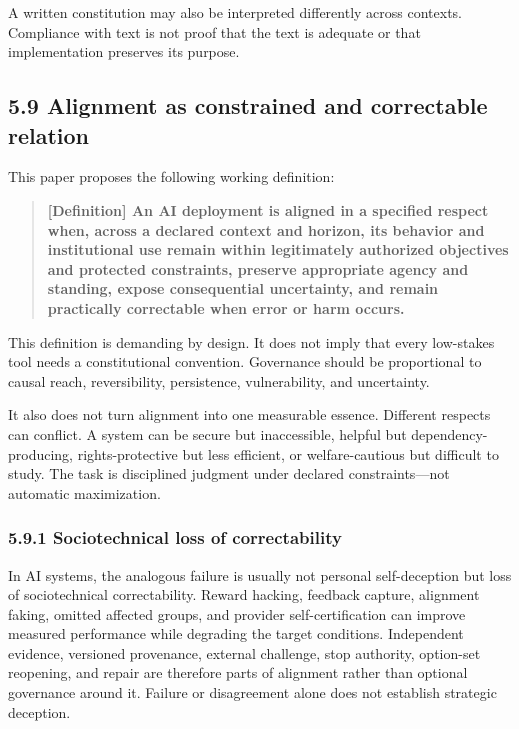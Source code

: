 \documentclass[
  11pt,
]{article}
\begin{document}
A written constitution may also be interpreted differently across
contexts. Compliance with text is not proof that the text is adequate or
that implementation preserves its purpose.

\subsection{5.9 Alignment as constrained and correctable
relation}\label{alignment-as-constrained-and-correctable-relation}

This paper proposes the following working definition:

\begin{quote}
\textbf{{[}Definition{]} An AI deployment is aligned in a specified
respect when, across a declared context and horizon, its behavior and
institutional use remain within legitimately authorized objectives and
protected constraints, preserve appropriate agency and standing, expose
consequential uncertainty, and remain practically correctable when error
or harm occurs.}
\end{quote}

This definition is demanding by design. It does not imply that every
low-stakes tool needs a constitutional convention. Governance should be
proportional to causal reach, reversibility, persistence, vulnerability,
and uncertainty.

It also does not turn alignment into one measurable essence. Different
respects can conflict. A system can be secure but inaccessible, helpful
but dependency-producing, rights-protective but less efficient, or
welfare-cautious but difficult to study. The task is disciplined
judgment under declared constraints---not automatic maximization.

\subsubsection{5.9.1 Sociotechnical loss of
correctability}\label{sociotechnical-loss-of-correctability}

In AI systems, the analogous failure is usually not personal
self-deception but loss of sociotechnical correctability. Reward
hacking, feedback capture, alignment faking, omitted affected groups,
and provider self-certification can improve measured performance while
degrading the target conditions. Independent evidence, versioned
provenance, external challenge, stop authority, option-set reopening,
and repair are therefore parts of alignment rather than optional
governance around it. Failure or disagreement alone does not establish
strategic deception.
\end{document}
